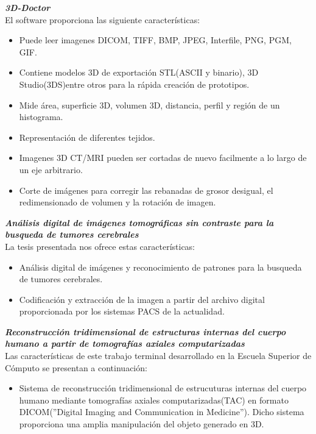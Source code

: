 \documentclass[12pt]{report}
\begin{document}
\hfill\break
\textbf{\textit{3D-Doctor}}\cite{tridi}
\\El software proporciona las siguiente características:
\begin{itemize}
\item Puede leer imagenes DICOM, TIFF, BMP, JPEG, Interfile, PNG, PGM, GIF.
\item Contiene modelos 3D de exportación STL(ASCII y binario), 3D Studio(3DS)entre otros para la rápida creación de prototipos.
\item Mide área, superficie 3D, volumen 3D, distancia, perfil y región de un histograma.
\item Representación de diferentes tejidos.
\item Imagenes 3D CT/MRI pueden ser cortadas de nuevo facilmente a lo largo de un eje arbitrario.
\item Corte de imágenes para corregir las rebanadas de grosor desigual, el redimensionado de volumen y la rotación de imagen.
\end{itemize}

\hfill\break
\textbf{\textit{Análisis digital de imágenes tomográficas sin contraste para la busqueda de tumores cerebrales}}\cite{edgardo}
\\La tesis presentada nos ofrece estas características:
\begin{itemize}
\item Análisis digital de imágenes y reconocimiento de patrones para la busqueda de tumores cerebrales.
\item Codificación y extracción de la imagen a partir del archivo digital proporcionada por los sistemas PACS de la actualidad.
\end{itemize}


\hfill\break
\textbf{\textit{Reconstrucción tridimensional de estructuras internas del cuerpo humano a partir de tomografías axiales computarizadas}}\cite{titi}
\\Las características de este trabajo terminal desarrollado en la Escuela Superior de Cómputo se presentan a continuación:
\begin{itemize}
\item Sistema de reconstrucción tridimensional de estrucuturas internas del cuerpo humano mediante tomografías axiales computarizadas(TAC) en formato DICOM(''Digital Imaging and Communication in Medicine''). Dicho sistema proporciona una amplia manipulación del objeto generado en 3D.
\end{itemize}
\end{document}
